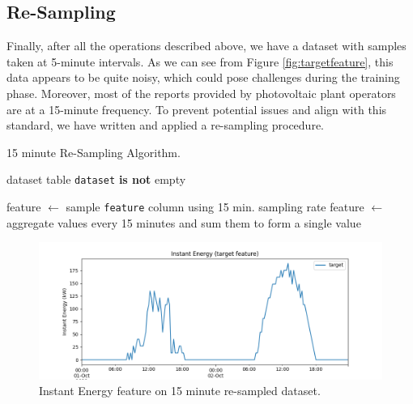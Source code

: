 \subsection{Re-Sampling}
Finally, after all the operations described above, we have a dataset
with samples taken at 5-minute intervals. As we can see from
Figure \ref{fig:targetfeature}, this data appears to be quite noisy,
which could pose
challenges during the training phase. Moreover, most of the reports
provided by photovoltaic plant operators are at a 15-minute frequency.
To prevent potential issues and align with this standard, we have
written and applied a re-sampling procedure.

%

\begin{algorithm}[H]
	\caption{15 minute Re-Sampling Algorithm.}\label{alg:resampling}
	\begin{algorithmic}
		\Require dataset table
		\Ensure \texttt{dataset} \textbf{is not} empty

		\State feature $\gets$ sample \texttt{feature} column using 15 min. sampling rate
		\Else
		\State feature $\gets$ aggregate values every 15 minutes and sum them to form a single value
		\EndIf
		\EndFor
	\end{algorithmic}
\end{algorithm}

\begin{figure}[H]
	\centering
	\includegraphics[width=\linewidth, keepaspectratio]{chapters/2_data_preprocessing/imgs/targetfeature15min.png}
	\caption{Instant Energy feature on 15 minute re-sampled dataset.}
	\label{fig:15min}
\end{figure}

